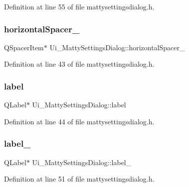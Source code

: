 Definition at line 55 of file mattysettingsdialog.\+h.

\hypertarget{classUi__MattySettingsDialog_a78704372a8ff324a1c60b57507468c81}{}\label{classUi__MattySettingsDialog_a78704372a8ff324a1c60b57507468c81} 
\subsubsection{\texorpdfstring{horizontal\+Spacer\+\_}{horizontalSpacer\_2}}
{\footnotesize\ttfamily Q\+Spacer\+Item$\ast$ Ui\+\_\+\+Matty\+Settings\+Dialog\+::horizontal\+Spacer\+\_}



Definition at line 43 of file mattysettingsdialog.\+h.

\hypertarget{classUi__MattySettingsDialog_a3e47a3a5cf6ede47f1c43c9b97d65f95}{}\label{classUi__MattySettingsDialog_a3e47a3a5cf6ede47f1c43c9b97d65f95} 
\subsubsection{\texorpdfstring{label}{label}}
{\footnotesize\ttfamily Q\+Label$\ast$ Ui\+\_\+\+Matty\+Settings\+Dialog\+::label}



Definition at line 44 of file mattysettingsdialog.\+h.

\hypertarget{classUi__MattySettingsDialog_afdd480526f52a4eea64cd5b78796b31f}{}\label{classUi__MattySettingsDialog_afdd480526f52a4eea64cd5b78796b31f} 
\subsubsection{\texorpdfstring{label\+\_}{label\_2}}
{\footnotesize\ttfamily Q\+Label$\ast$ Ui\+\_\+\+Matty\+Settings\+Dialog\+::label\+\_}



Definition at line 51 of file mattysettingsdialog.\+h.

